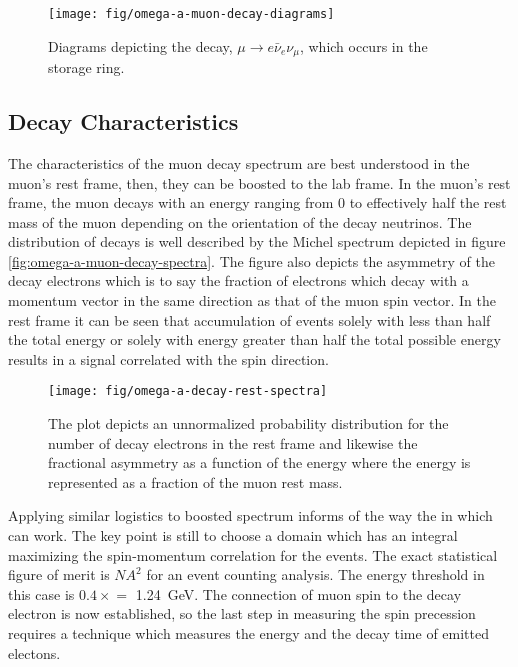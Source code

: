 \begin{figure}
\label{fig:omega-a-muon-decay-diagrams}
\texttt{[image: fig/omega-a-muon-decay-diagrams]}
\caption{Diagrams depicting the decay, $\mu \rightarrow e \bar{\nu}_e \nu_\mu$, which occurs in the \gmtwo storage ring. }
\end{figure}

\subsection{Decay Characteristics}

The characteristics of the muon decay spectrum are best understood in the muon's rest frame, then, they can be boosted to the lab frame.  In the muon's rest frame, the muon decays with an energy ranging from 0 to effectively half the rest mass of the muon depending on the orientation of the decay neutrinos.  The distribution of decays is well described by the Michel spectrum depicted in figure \ref{fig:omega-a-muon-decay-spectra}.  The figure also depicts the asymmetry of the decay electrons which is to say the fraction of electrons which decay with a momentum vector in the same direction as that of the muon spin vector.  In the rest frame it can be seen that accumulation of events solely with less than half the total energy or solely with energy greater than half the total possible energy results in a signal correlated with the spin direction. \cite{e821-prd}

\begin{figure}
\label{fig:omega-a-decay-rest-spectra}
\texttt{[image: fig/omega-a-decay-rest-spectra]}
\caption{The plot depicts an unnormalized probability distribution for the number of decay electrons in the rest frame and likewise the fractional asymmetry as a function of the energy where the energy is represented as a fraction of the muon rest mass. }
\end{figure}

Applying similar logistics to boosted spectrum informs of the way the in which \gmtwo can work.  The key point is still to choose a domain which has an integral maximizing the spin-momentum correlation for the events.  The exact statistical figure of merit is $NA^2$ for an event counting analysis.  The energy threshold in this case is $0.4\times$\pmagic$ = $ \SI{1.24}{\GeV}.  The connection of muon spin to the decay electron is now established, so the last step in measuring the spin precession requires a technique which measures the energy and the decay time of emitted electons. \cite{e821-prd}

